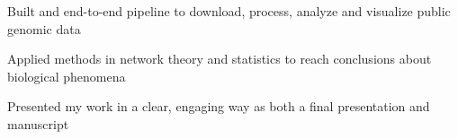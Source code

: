 \begin{cventries}
{\begin{cvitems}
         \item {Built and end-to-end pipeline to download, process, analyze and visualize public genomic data}
         \item {Applied methods in network theory and statistics to reach conclusions about biological phenomena}
         \item {Presented my work in a clear, engaging way as both a final presentation and manuscript}
        \end{cvitems}
      }
\end{cventries}
